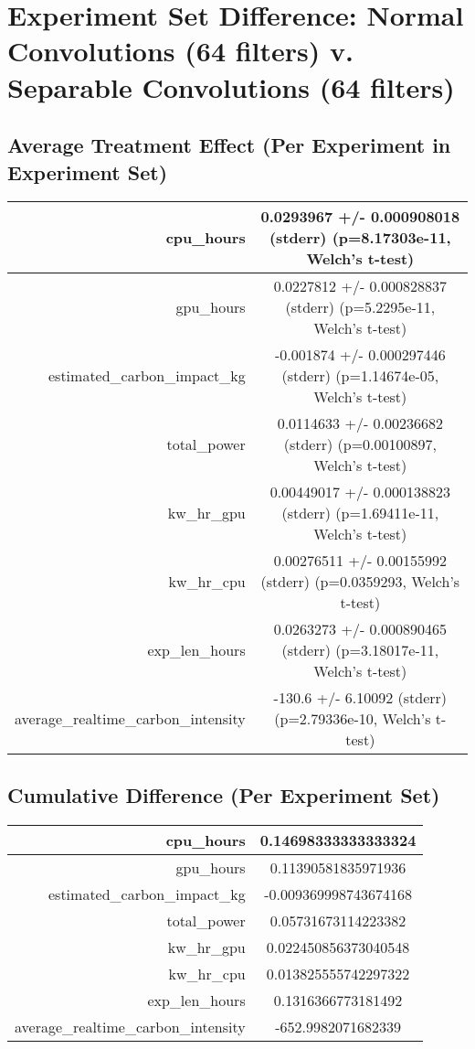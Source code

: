 \documentclass{article}%
\begin{document}
%
\normalsize%
\section{Experiment Set Difference: Normal Convolutions (64 filters) v. Separable Convolutions (64 filters)}%
\label{sec:Experiment Set Difference Normal Convolutions (64 filters) v. Separable Convolutions (64 filters)}%
\subsection{Average Treatment Effect (Per Experiment in Experiment Set)}%
\label{subsec:Average Treatment Effect (Per Experiment in Experiment Set)}%
\begin{tabular}{|r|c|}%
\hline%
cpu\_hours&0.0293967 +/{-} 0.000908018 (stderr) (p=8.17303e{-}11, Welch's t{-}test)\\%
\hline%
gpu\_hours&0.0227812 +/{-} 0.000828837 (stderr) (p=5.2295e{-}11, Welch's t{-}test)\\%
\hline%
estimated\_carbon\_impact\_kg&{-}0.001874 +/{-} 0.000297446 (stderr) (p=1.14674e{-}05, Welch's t{-}test)\\%
\hline%
total\_power&0.0114633 +/{-} 0.00236682 (stderr) (p=0.00100897, Welch's t{-}test)\\%
\hline%
kw\_hr\_gpu&0.00449017 +/{-} 0.000138823 (stderr) (p=1.69411e{-}11, Welch's t{-}test)\\%
\hline%
kw\_hr\_cpu&0.00276511 +/{-} 0.00155992 (stderr) (p=0.0359293, Welch's t{-}test)\\%
\hline%
exp\_len\_hours&0.0263273 +/{-} 0.000890465 (stderr) (p=3.18017e{-}11, Welch's t{-}test)\\%
\hline%
average\_realtime\_carbon\_intensity&{-}130.6 +/{-} 6.10092 (stderr) (p=2.79336e{-}10, Welch's t{-}test)\\%
\hline%
\end{tabular}

%
\subsection{Cumulative Difference (Per Experiment Set)}%
\label{subsec:Cumulative Difference (Per Experiment Set)}%
\begin{tabular}{|r|c|}%
\hline%
cpu\_hours&0.14698333333333324\\%
\hline%
gpu\_hours&0.11390581835971936\\%
\hline%
estimated\_carbon\_impact\_kg&{-}0.009369998743674168\\%
\hline%
total\_power&0.05731673114223382\\%
\hline%
kw\_hr\_gpu&0.022450856373040548\\%
\hline%
kw\_hr\_cpu&0.013825555742297322\\%
\hline%
exp\_len\_hours&0.1316366773181492\\%
\hline%
average\_realtime\_carbon\_intensity&{-}652.9982071682339\\%
\hline%
\end{tabular}

%
\end{document}
